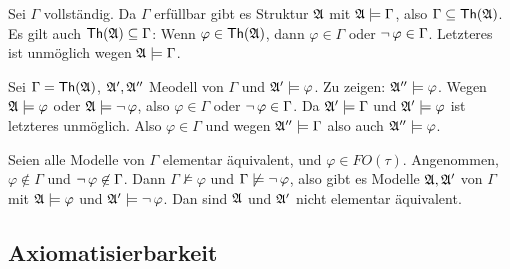 \begin{description}[style=nextline]
  \item[(1)$\IMPL$(2)]
  Sei $\Gamma$ vollständig. Da $\Gamma$ erfüllbar gibt es Struktur
  $\mathfrak{A}$ mit $\mathfrak{A}\models\Gamma$, also $\Gamma\subseteq\operatorname{\text{\textsf{Th}}}(\mathfrak{A})$.
  Es gilt auch $\operatorname{\text{\textsf{Th}}}(\mathfrak{A})\subseteq\Gamma$: Wenn $\varphi\in\operatorname{\text{\textsf{Th}}}(\mathfrak{A})$,
  dann $\varphi\in\Gamma$ oder $\operatorname{\neg}\varphi\in\Gamma$. Letzteres ist
  unmöglich wegen $\mathfrak{A}\models\Gamma$.
  
  \item[(2)$\IMPL$(3)]
  Sei $\Gamma=\operatorname{\text{\textsf{Th}}}(\mathfrak{A})$, $\mathfrak{A}', \mathfrak{A}''$ Meodell von $\Gamma$ und
  $\mathfrak{A}'\models\varphi$. Zu zeigen: $\mathfrak{A}''\models\varphi$. Wegen
  $\mathfrak{A}\models\varphi$ oder $\mathfrak{A}\models\operatorname{\neg}\varphi$, also
  $\varphi\in\Gamma$ oder $\operatorname{\neg}\varphi\in\Gamma$. Da $\mathfrak{A}'\models\Gamma$
  und $\mathfrak{A}'\models\varphi$ ist letzteres unmöglich. Also $\varphi\in\Gamma$
  und wegen $\mathfrak{A}''\models\Gamma$ also auch $\mathfrak{A}''\models\varphi$.
  
  \item[(3)$\IMPL$(1)]
  Seien alle Modelle von $\Gamma$ elementar äquivalent, und $\varphi\in
  FO(\tau)$. Angenommen, $\varphi\not\in\Gamma$ und $\operatorname{\neg}\varphi\not\in\Gamma$.
  Dann $\Gamma\not\models\varphi$ und $\Gamma\not\models\operatorname{\neg}\varphi$, also
  gibt es Modelle $\mathfrak{A}, \mathfrak{A}'$ von $\Gamma$ mit $\mathfrak{A}\models\varphi$
  und $\mathfrak{A}'\models\operatorname{\neg}\varphi$. Dan sind $\mathfrak{A}$ und $\mathfrak{A}'$ nicht
  elementar äquivalent.
\end{description}

\subsection{Axiomatisierbarkeit}


